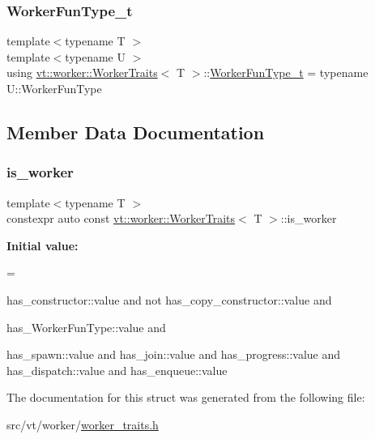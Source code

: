 \subsubsection{\texorpdfstring{Worker\+Fun\+Type\+\_\+t}{WorkerFunType\_t}}
{\footnotesize\ttfamily template$<$typename T $>$ \\
template$<$typename U $>$ \\
using \hyperlink{structvt_1_1worker_1_1_worker_traits}{vt\+::worker\+::\+Worker\+Traits}$<$ T $>$\+::\hyperlink{structvt_1_1worker_1_1_worker_traits_a62aa14ab158ff54d290cc2124c5ce3e1}{Worker\+Fun\+Type\+\_\+t} =  typename U\+::\+Worker\+Fun\+Type}



\subsection{Member Data Documentation}
\mbox{\label{structvt_1_1worker_1_1_worker_traits_af1a45fbd305afd463afd7314a04c0ae4}} 
\subsubsection{\texorpdfstring{is\+\_\+worker}{is\_worker}}
{\footnotesize\ttfamily template$<$typename T $>$ \\
constexpr auto const \hyperlink{structvt_1_1worker_1_1_worker_traits}{vt\+::worker\+::\+Worker\+Traits}$<$ T $>$\+::is\+\_\+worker\hspace{0.3cm}{\ttfamily [static]}}

{\bfseries Initial value\+:}
\begin{DoxyCode}
=
    
    has\_constructor::value and not has\_copy\_constructor::value and
    
    has\_WorkerFunType::value and
    
    
    has\_spawn::value and has\_join::value and has\_progress::value and
    has\_dispatch::value and has\_enqueue::value
\end{DoxyCode}


The documentation for this struct was generated from the following file\+:\begin{DoxyCompactItemize}
\item 
src/vt/worker/\hyperlink{worker__traits_8h}{worker\+\_\+traits.\+h}\end{DoxyCompactItemize}
